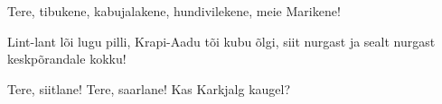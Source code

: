 Tere, tibukene, kabujalakene,
hundivilekene, meie Marikene!

Lint-lant l\~oi lugu pilli,
Krapi-Aadu t\~oi kubu \~olgi,
siit nurgast ja sealt nurgast
keskp\~orandale kokku!

Tere, siitlane!
Tere, saarlane!
Kas Karkjalg kaugel? 